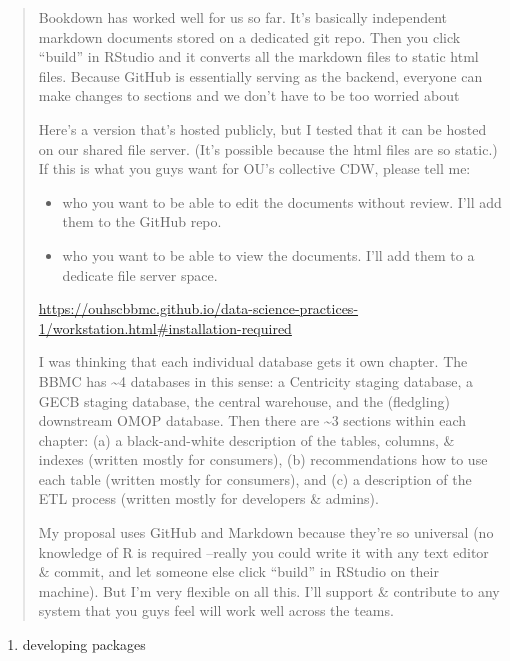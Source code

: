 \documentclass[
]{book}
\providecommand{\tightlist}{%
  \setlength{\itemsep}{0pt}\setlength{\parskip}{0pt}}
\begin{document}
\begin{quote}
Bookdown has worked well for us so far. It's basically independent markdown documents stored on a dedicated git repo. Then you click ``build'' in RStudio and it converts all the markdown files to static html files. Because GitHub is essentially serving as the backend, everyone can make changes to sections and we don't have to be too worried about

Here's a version that's hosted publicly, but I tested that it can be hosted on our shared file server. (It's possible because the html files are so static.) If this is what you guys want for OU's collective CDW, please tell me:

\begin{itemize}
\tightlist
\item
  who you want to be able to edit the documents without review. I'll add them to the GitHub repo.
\item
  who you want to be able to view the documents. I'll add them to a dedicate file server space.
\end{itemize}

\url{https://ouhscbbmc.github.io/data-science-practices-1/workstation.html\#installation-required}

I was thinking that each individual database gets it own chapter. The BBMC has \textasciitilde4 databases in this sense: a Centricity staging database, a GECB staging database, the central warehouse, and the (fledgling) downstream OMOP database. Then there are \textasciitilde3 sections within each chapter: (a) a black-and-white description of the tables, columns, \& indexes (written mostly for consumers), (b) recommendations how to use each table (written mostly for consumers), and (c) a description of the ETL process (written mostly for developers \& admins).

My proposal uses GitHub and Markdown because they're so universal (no knowledge of R is required --really you could write it with any text editor \& commit, and let someone else click ``build'' in RStudio on their machine). But I'm very flexible on all this. I'll support \& contribute to any system that you guys feel will work well across the teams.
\end{quote}

\begin{enumerate}
\def\labelenumi{\arabic{enumi}.}
\tightlist
\item
  developing packages
\end{enumerate}
\end{document}
